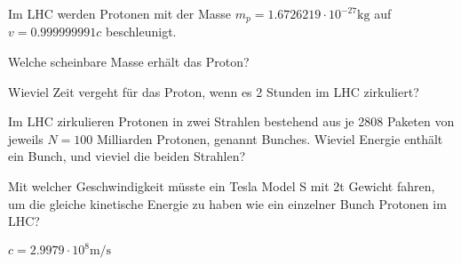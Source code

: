 Im LHC werden Protonen mit der Masse $m_p=1.6726219\cdot 10^{-27}\text{kg}$
auf $v=0.999999991c$ beschleunigt.
\begin{teilaufgaben}
\item Welche scheinbare Masse erhält das Proton?
\item Wieviel Zeit vergeht für das Proton, wenn es 2 Stunden im LHC
zirkuliert?
\item Im LHC zirkulieren Protonen in zwei Strahlen bestehend aus je
2808 Paketen von jeweils $N=100\text{ Milliarden}$ Protonen, genannt Bunches.
Wieviel Energie enthält ein Bunch, und vieviel die beiden Strahlen?
\item Mit welcher Geschwindigkeit müsste ein Tesla Model S mit 2t Gewicht
fahren, um die gleiche kinetische Energie zu haben wie ein einzelner Bunch
Protonen im LHC?
\end{teilaufgaben}

\begin{hinweis}
$c=2.9979\cdot 10^8\text{m/s}$
\end{hinweis}

